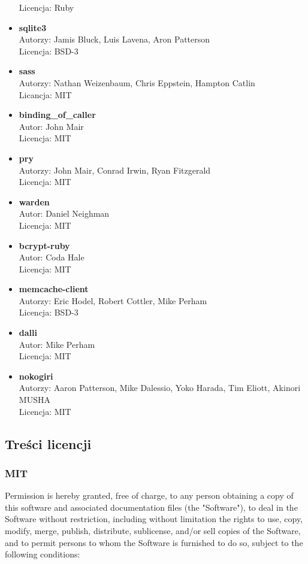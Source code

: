 \documentclass[11pt,a4paper, twoside]{article}
\begin{document}
\begin{itemize}
Licencja: Ruby
\item \textbf{sqlite3} \\ 
Autorzy: Jamis Bluck, Luis Lavena, Aron Patterson \\
Licencja: BSD-3
\item \textbf{sass} \\
Autorzy: Nathan Weizenbaum, Chris Eppstein, Hampton Catlin \\
Licancja: MIT
\item \textbf{binding\_of\_caller} \\ 
Autor: John Mair \\
Licencja: MIT
\item \textbf{pry} \\
Autorzy: John Mair, Conrad Irwin, Ryan Fitzgerald \\
Licencja: MIT
\item \textbf{warden} \\ 
Autor: Daniel Neighman \\
Licencja: MIT
\item \textbf{bcrypt-ruby} \\ 
Autor: Coda Hale \\
Licencja: MIT
\item \textbf{memcache-client} \\
Autorzy: Eric Hodel, Robert Cottler, Mike Perham \\
Licencja:  BSD-3
\item \textbf{dalli} \\ 
Autor: Mike Perham \\
Licencja: MIT
\item \textbf{nokogiri} \\ 
Autorzy: Aaron Patterson, Mike Dalessio, Yoko Harada, Tim Eliott, Akinori MUSHA  \\
Licencja: MIT
\end{itemize}
\newpage

\subsection{Treści licencji}
\subsubsection{MIT}
Permission is hereby granted, free of charge, to any person obtaining
a copy of this software and associated documentation files (the
"Software"), to deal in the Software without restriction, including
without limitation the rights to use, copy, modify, merge, publish,
distribute, sublicense, and/or sell copies of the Software, and to
permit persons to whom the Software is furnished to do so, subject to
the following conditions:
\end{document}
